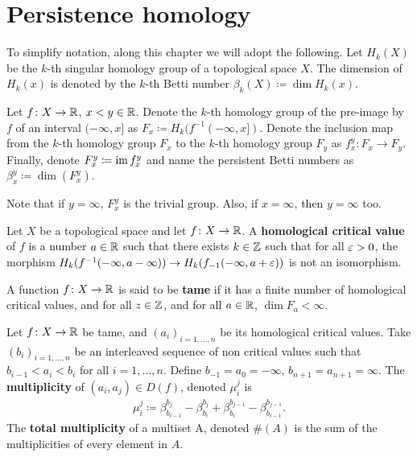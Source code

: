 \section{Persistence homology}
 To simplify notation, along this chapter we will adopt the following. Let $ H_k(X) $ be the $k$-th singular homology group of a topological space $ X $. The dimension of $ H_k(x) $ is denoted by the $k$-th Betti number $ \beta_k(X) \coloneq \dim H_k(x) $.

Let $ f\colon X \to \mathbb R $, $x < y \in \mathbb R$. Denote the $k$-th homology group of the pre-image by $ f $ of an interval $ (-\infty, x] $ as $ F_x \coloneq H_k(f^{-1}(-\infty, x])$. Denote the inclusion map from the $k$-th homology group $ F_x$ to the  $k$-th homology group $ F_y$ as $f_x^y \colon F_x \to F_y $. Finally, denote $ F_x^y \coloneq \operatorname{im} f_x^y $ and name the persistent Betti numbers as $ \beta_x^y \coloneq \dim(F_x^y) $.

Note that if $ y = \infty $, $ F_x^y $ is the trivial group. Also, if $ x = \infty $, then $ y = \infty $ too. 

\begin{definition}
    Let $ X $ be a topological space and let $ f\colon X \to \mathbb R $. A {\bf homological critical value} of $ f $ is   a number $ a \in \mathbb R $ such that there exists $k \in \mathbb Z$ such that for all 
    $ \varepsilon > 0 $, the morphism $ H_k(f^{-1}(-\infty, a - \infty)) \to H_k(f_{-1}(-\infty, a + \varepsilon)) $ is not an isomorphism.
\end{definition}

\begin{definition} \label{def:tame-function}
    A function $ f\colon X \to \mathbb R $ is said to be {\bf tame} if it has a finite number of homological critical values, and for all $ z \in \mathbb Z $, and for all $ a \in \mathbb R $, $ \dim F_a < \infty $.
\end{definition}

\begin{definition}[Multiplicity]
    Let $f \colon X \to \mathbb R $ be tame, and $ (a_i)_{i = 1, \dots, n} $ be its homological critical values. Take $ (b_i)_{i = 1, \dots, n} $ be an interleaved sequence of non critical values such that $ b_{i-1} < a_i < b_i $ for all $ i = 1, \dots, n $. Define $ b_{-1} = a_0 = -\infty $, $b_{n+1} = a_{n+1} = \infty $. The {\bf multiplicity} of $ (a_i, a_j) \in D(f) $, denoted $ \mu_i^j $ is
    \begin{align}
        \mu_i^j \coloneq \beta_{b_{i-1}}^{b_j} - \beta_{b_{i}}^{b_j} + \beta_{b_{i}}^{b_{j-1}} - \beta_{b_{i-1}}^{b_{j-1}}.
    \end{align}
    The {\bf total multiplicity} of a multiset A, denoted $ \#(A) $ is the sum of the multiplicities of every element in $A$.
\end{definition}

